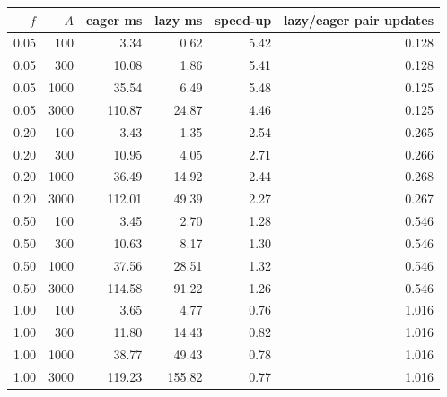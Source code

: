 \begin{tabular}{rrrrrr}
\toprule
$f$ & $A$ & eager ms & lazy ms & speed-up & lazy/eager pair updates \\
\midrule
0.05 & 100 & 3.34 & 0.62 & 5.42 & 0.128 \\
0.05 & 300 & 10.08 & 1.86 & 5.41 & 0.128 \\
0.05 & 1000 & 35.54 & 6.49 & 5.48 & 0.125 \\
0.05 & 3000 & 110.87 & 24.87 & 4.46 & 0.125 \\
0.20 & 100 & 3.43 & 1.35 & 2.54 & 0.265 \\
0.20 & 300 & 10.95 & 4.05 & 2.71 & 0.266 \\
0.20 & 1000 & 36.49 & 14.92 & 2.44 & 0.268 \\
0.20 & 3000 & 112.01 & 49.39 & 2.27 & 0.267 \\
0.50 & 100 & 3.45 & 2.70 & 1.28 & 0.546 \\
0.50 & 300 & 10.63 & 8.17 & 1.30 & 0.546 \\
0.50 & 1000 & 37.56 & 28.51 & 1.32 & 0.546 \\
0.50 & 3000 & 114.58 & 91.22 & 1.26 & 0.546 \\
1.00 & 100 & 3.65 & 4.77 & 0.76 & 1.016 \\
1.00 & 300 & 11.80 & 14.43 & 0.82 & 1.016 \\
1.00 & 1000 & 38.77 & 49.43 & 0.78 & 1.016 \\
1.00 & 3000 & 119.23 & 155.82 & 0.77 & 1.016 \\
\bottomrule
\end{tabular}
